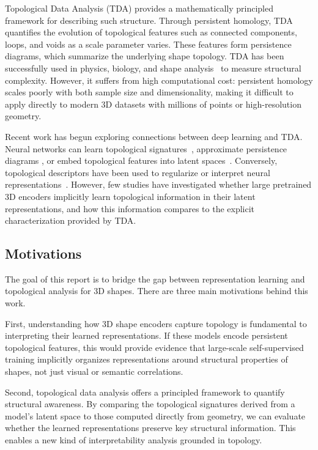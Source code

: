 Topological Data Analysis (TDA) provides a mathematically principled framework for describing such structure. Through persistent homology, TDA quantifies the evolution of topological features such as connected components, loops, and voids as a scale parameter varies. These features form persistence diagrams, which summarize the underlying shape topology. TDA has been successfully used in physics, biology, and shape analysis~\cite{top_signatures} to measure structural complexity. However, it suffers from high computational cost: persistent homology scales poorly with both sample size and dimensionality, making it difficult to apply directly to modern 3D datasets with millions of points or high-resolution geometry.

Recent work has begun exploring connections between deep learning and TDA\cite{optimizing_persistent_homology, persistent_homology_seg, }. Neural networks can learn topological signatures~\cite{atol}, approximate persistence diagrams \cite{neural_approximation_graph_topological_features}, or embed topological features into latent spaces~\cite{topological_autoencoders}. Conversely, topological descriptors have been used to regularize or interpret neural representations~\cite{top_layer, topology_activations, top_reg}. However, few studies have investigated whether large pretrained 3D encoders implicitly learn topological information in their latent representations, and how this information compares to the explicit characterization provided by TDA.

\subsection{Motivations}

The goal of this report is to bridge the gap between representation learning and topological analysis for 3D shapes. There are three main motivations behind this work.

First, understanding how 3D shape encoders capture topology is fundamental to interpreting their learned representations. If these models encode persistent topological features, this would provide evidence that large-scale self-supervised training implicitly organizes representations around structural properties of shapes, not just visual or semantic correlations.

Second, topological data analysis offers a principled framework to quantify structural awareness. By comparing the topological signatures derived from a model’s latent space to those computed directly from geometry, we can evaluate whether the learned representations preserve key structural information. This enables a new kind of interpretability analysis grounded in topology.

